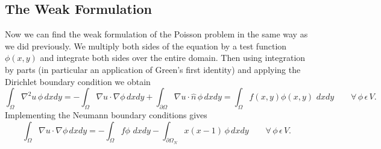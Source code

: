 \documentclass{article}
\begin{document}
\subsection{The Weak Formulation}
Now we can find the weak formulation of the Poisson problem in the same way as we did previously. We multiply both sides of the equation by a test function $\phi(x,y)$ and integrate both sides over the entire domain. Then using integration by parts (in particular an application of Green's first identity) and applying the Dirichlet boundary condition we obtain
\[\int_{\Omega} \nabla^2 u \,\phi \,dxdy = - \int_{\Omega} \nabla u\cdot\nabla\phi \,dxdy + \int_{\partial\Omega} \nabla u\cdot \hat{n} \,\phi \,dxdy
= \int_{\Omega} f(x,y)\phi(x,y) \,\,dxdy \qquad\forall\,\phi\, \epsilon\, V.\]
Implementing the Neumann boundary conditions gives
$$\int_{\Omega} \nabla u\cdot\nabla\phi \,dxdy =
 - \int_{\Omega} f\phi \,\,dxdy - \int_{\partial\Omega_N}x(x-1) \,\phi \,dxdy\qquad\forall\,\phi\, \epsilon\, V.$$
\end{document}
